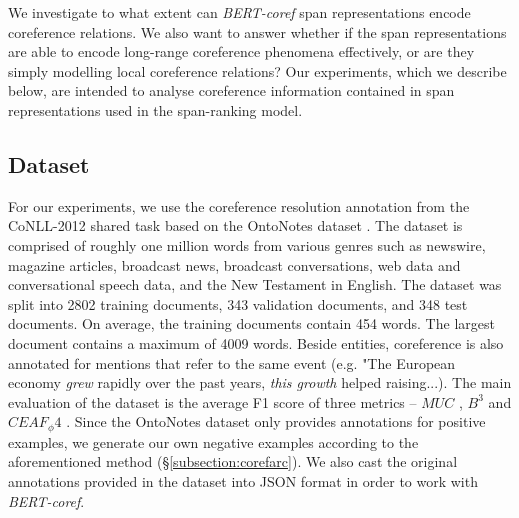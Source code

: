 \documentclass[11pt]{article}
\begin{document}


We investigate to what extent can \textit{BERT-coref} span representations encode coreference relations. We also want to answer whether if the span representations are able to encode long-range coreference phenomena effectively, or are they simply modelling local coreference relations? Our experiments, which we describe below, are intended to analyse coreference information contained in span representations used in the span-ranking model. 

\subsection{Dataset}
For our experiments, we use the coreference resolution annotation
from the CoNLL-2012 shared task based on the OntoNotes dataset \parencite{conll}. The dataset is comprised of roughly one million words from various genres such as newswire, magazine articles, broadcast news, broadcast conversations, web data and conversational speech data, and the New Testament in English. The dataset was split into 2802 training documents, 343 validation documents, and 348 test documents. On average, the training documents contain 454 words. The largest document contains a maximum of 4009 words. Beside entities, coreference is also annotated for mentions that refer to the same event (e.g. "The European economy \textit{grew} rapidly over the past years, \textit{this growth} helped raising...). The main evaluation of the dataset is the average F1 score of three metrics – $MUC$ \parencite{vilain-etal-1995-model}, $B^3$ \parencite{Bagga98algorithmsfor} and $CEAF_ \phi4$ \parencite{luo-2005-coreference}. Since the OntoNotes dataset only provides annotations for positive examples, we generate our own negative examples according to the aforementioned method (\S \ref{subsection:corefarc}). We also cast the original annotations provided in the dataset into JSON format in order to work with \textit{BERT-coref}. 
\end{document}
